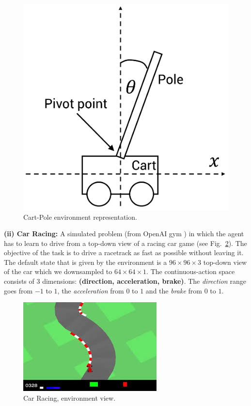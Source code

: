 \begin{figure}[h]
    \centering
    \includegraphics[scale=0.27]{imagenes/cap2/cartpole.pdf}
    \caption{Cart-Pole environment representation.}
    \label{fig:cartpole}
\end{figure}


\textbf{(ii) Car Racing:} A simulated problem (from OpenAI gym \cite{brockman2016openai}) in which the agent has to learn to drive from a top-down view of a racing car game (see Fig.~\ref{fig:Car_Racing}). The objective of the task is to drive a racetrack as fast as possible without leaving it. The default state that is given by the environment is a $96\times96\times3$ top-down view of the car which we downsampled to $64\times64\times1$. The continuous-action space consists of 3 dimensions: \textbf{(direction, acceleration, brake)}. The \emph{direction} range goes from $-1$ to $1$, the \emph{acceleration} from $0$ to $1$ and the \emph{brake} from $0$ to $1$.

\begin{figure}[h]
    \centering
    \includegraphics[scale=0.7]{imagenes/cap3/car_racing_env.jpg}
    \caption{Car Racing, environment view.}
    \label{fig:Car_Racing}
\end{figure}

